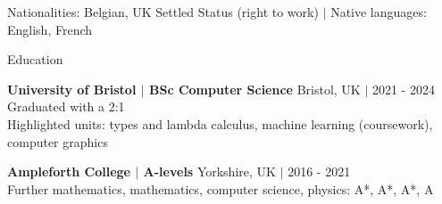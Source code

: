\documentclass{resume} %
\begin{document}
\vspace{-10pt}
\begin{center}
    Nationalities: Belgian, UK Settled Status (right to work) ${\vert}$ Native languages: English, French
\end{center}

\begin{rSection}{Education}

{\bf University of Bristol $\boldsymbol{\vert}$ BSc Computer Science} \hfill Bristol, UK $\boldsymbol{\vert}$ 2021 - 2024 \\
Graduated with a 2:1 \\
Highlighted units: types and lambda calculus, machine learning (coursework), computer graphics

{\bf Ampleforth College $\boldsymbol{\vert}$ A-levels} \hfill Yorkshire, UK $\boldsymbol{\vert}$ 2016 - 2021 \\
Further mathematics, mathematics, computer science, physics: A*, A*, A*, A

\end{rSection}

\end{document}
